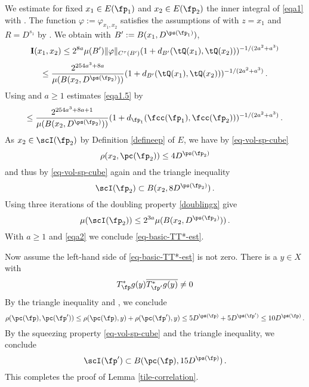 We estimate for fixed $x_1\in E(\fp_1)$ and
$x_2\in E(\fp_2)$ the inner integral of \eqref{eqa1} with
. The function
$\varphi:=\varphi_{x_1,x_2}$ satisfies the assumptions of
 with $z = x_1$ and $R = D^{s_1}$ by .
We obtain with $B':= B(x_1, D^{\ps(\fp_1)})$,
\begin{equation*}
 {\bf I}(x_1, x_2) \le 2^{8a} \mu(B') \|{\varphi}\|_{C^\tau(B')}
       (1 + d_{B'}(\tQ(x_1),\tQ(x_2)))^{-1/(2a^2+a^3)}
\end{equation*}
\begin{equation}
\label{eqa1.5}
 \le \frac{2^{254a^3+8a}}
 {\mu(B(x_2, D^{\ps(\fp_2)}))}
       (1 + d_{B'}(\tQ(x_1),\tQ(x_2)))^{-1/(2a^2+a^3)}\,.
\end{equation}
Using  and $a\ge 1$ estimates \eqref{eqa1.5} by
\begin{equation}\label{eqa2}
 \le \frac{2^{254a^3 + 8a + 1}}
 {\mu(B(x_2, D^{\ps(\fp_2)}))}
       (1+d_{\fp_1}(\fcc(\fp_1), \fcc(\fp_2)))^{-1/(2a^2+a^3)}\,.
\end{equation}
As $x_2\in \scI(\fp_2)$ by Definition \eqref{defineep} of $E$, we have by \eqref{eq-vol-sp-cube}
\begin{equation}
    \rho(x_2,\pc(\fp_2))\le 4D^{\ps(\fp_2)}
\end{equation}
and thus by \eqref{eq-vol-sp-cube} again and the triangle inequality
\begin{equation}
    \scI(\fp_2)\subset B(x_2,8D^{\ps(\fp_2)})\, .
\end{equation}
Using three iterations of the doubling property \eqref{doublingx} give
\begin{equation}
    \mu(\scI(\fp_2))\le 2^{3a}\mu(B(x_2,D^{\ps(\fp_2)}))\, .
\end{equation}
With $a\ge 1$ and \eqref{eqa2} we conclude \eqref{eq-basic-TT*-est}.


Now assume the left-hand side of \eqref{eq-basic-TT*-est} is not zero.
There is a $y\in X$ with
\begin{equation}
    T^*_{\fp}g(y)\overline{T^*_{\fp'}g(y)}\neq 0
\end{equation}
By the triangle inequality and , we conclude
\begin{equation}
   \rho(\pc(\fp),\pc(\fp'))\le \rho(\pc(\fp),y) +\rho(\pc(\fp'),y)
   \le 5D^{\ps(\fp)}+5D^{\ps(\fp')}\le 10 D^{\ps(\fp)}\, .
\end{equation}
By the squeezing property \eqref{eq-vol-sp-cube} and the triangle inequality,
we conclude
\begin{equation}
    \scI(\fp') \subset B(\pc(\fp), 15D^{\ps(\fp)})\, .
\end{equation}
   This completes the proof of Lemma \ref{tile-correlation}.





